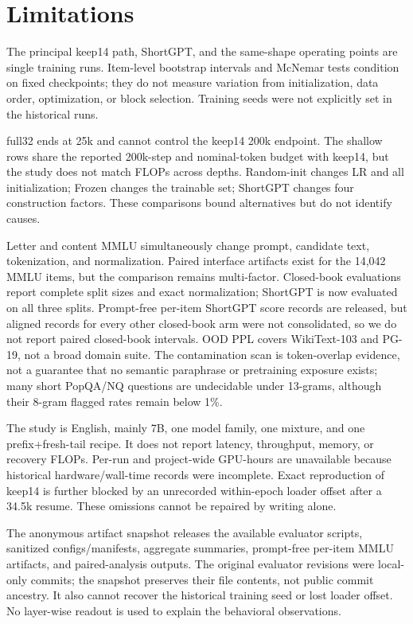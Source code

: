 \section*{Limitations}

The principal keep14 path, ShortGPT, and the same-shape operating points are
single training runs. Item-level bootstrap intervals and McNemar tests condition
on fixed checkpoints; they do not measure variation from initialization, data
order, optimization, or block selection. Training seeds were not explicitly
set in the historical runs.

full32 ends at 25k and cannot control the keep14 200k endpoint. The shallow
rows share the reported 200k-step and nominal-token budget with keep14, but the
study does not match FLOPs across depths.
Random-init changes LR and all initialization; Frozen changes the trainable
set; ShortGPT changes four construction factors. These comparisons bound
alternatives but do not identify causes.

Letter and content MMLU simultaneously change prompt, candidate text,
tokenization, and normalization. Paired interface artifacts exist for the
14,042 MMLU items, but the comparison remains multi-factor. Closed-book
evaluations report complete split sizes and exact normalization; ShortGPT is
now evaluated on all three splits. Prompt-free per-item ShortGPT score records
are released, but aligned records for every other closed-book arm were not
consolidated, so we do not report paired closed-book intervals. OOD PPL covers
WikiText-103 and PG-19, not a broad domain suite. The contamination scan is
token-overlap evidence, not a guarantee that no semantic paraphrase or
pretraining exposure exists; many short PopQA/NQ questions are undecidable
under 13-grams, although their 8-gram flagged rates remain below 1\%.

The study is English, mainly 7B, one model family, one mixture, and one
prefix+fresh-tail recipe. It does not report latency, throughput, memory, or
recovery FLOPs. Per-run and project-wide GPU-hours are unavailable because
historical hardware/wall-time records were incomplete. Exact reproduction of
keep14 is further blocked by an unrecorded within-epoch loader offset after a
34.5k resume. These omissions cannot be repaired by writing alone.

The anonymous artifact snapshot releases the available evaluator scripts,
sanitized configs/manifests, aggregate summaries, prompt-free per-item MMLU
artifacts, and paired-analysis outputs. The original evaluator revisions were
local-only commits; the snapshot preserves their file contents, not public
commit ancestry. It also cannot recover the historical training seed or lost
loader offset. No layer-wise readout is used to explain the behavioral
observations.
